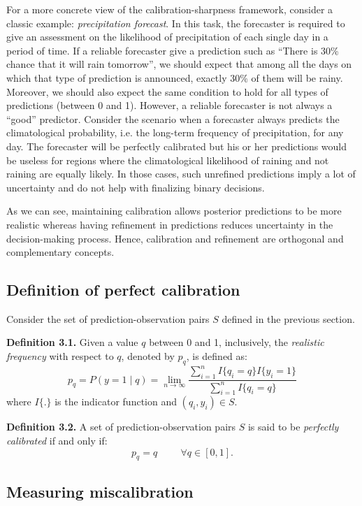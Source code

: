 For a more concrete view of the calibration-sharpness framework, consider a classic example: \textit{precipitation forecast}. In this task, the forecaster is required to give an assessment on the likelihood of precipitation of each single day in a period of time. If a reliable forecaster give a prediction such as ``There is 30\% chance that it will rain tomorrow'', we should expect that among all the days on which that type of prediction is announced, exactly 30\% of them will be rainy. Moreover, we should also expect the same condition to hold for all types of predictions (between 0 and 1). However, a reliable forecaster is not always a ``good'' predictor. Consider the scenario when a forecaster always predicts the climatological probability, i.e. the long-term frequency of precipitation, for any day. The forecaster will be perfectly calibrated but his or her predictions would be useless for regions where the climatological likelihood of raining and not raining are equally likely. In those cases, such unrefined predictions imply a lot of uncertainty and do not help with finalizing binary decisions.  

As we can see, maintaining calibration allows posterior predictions to be more realistic whereas having refinement in predictions reduces uncertainty in the decision-making process. Hence, calibration and refinement are orthogonal and complementary concepts.    

\subsection{Definition of perfect calibration}

Consider the set of prediction-observation pairs $S$ defined in the previous section.

\textbf{Definition 3.1.} Given a value $q$ between 0 and 1, inclusively, the \textit{realistic frequency} with respect to $q$, denoted by $p_q$, is defined as:
$$p_q = P(y = 1 \mid q) = \lim_{n\to\infty} \frac{\sum_{i=1}^nI\{q_i = q\}I\{y_i = 1\}}{\sum_{i=1}^nI\{q_i = q\}}$$ where $I\{.\}$ is the indicator function and $(q_i, y_i) \in S$.

\textbf{Definition 3.2.} A set of prediction-observation pairs $S$ is said to be \textit{perfectly calibrated} if and only if:
$$p_q = q \hspace{1cm} \forall q \in [0, 1].$$  

\subsection{Measuring miscalibration}


